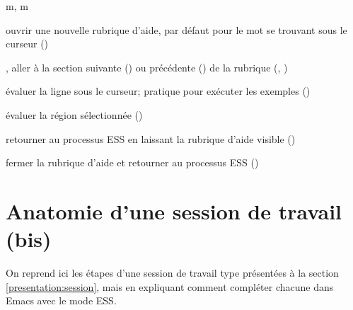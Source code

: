 \begin{ttscript}{m, m}
  \raggedright
\item[\ess{h}] ouvrir une nouvelle rubrique d'aide, par défaut pour le
  mot se trouvant sous le curseur ()
\item[\ess{n}, \ess{p}] aller à la section suivante () ou
  précédente () de la rubrique
  (,
  )
\item[\ess{l}] évaluer la ligne sous le curseur; pratique pour
  exécuter les exemples ()
\item[\ess{r}] évaluer la région sélectionnée ()
\item[\ess{q}] retourner au processus ESS en laissant la rubrique
  d'aide visible ()
\item[\ess{x}] fermer la rubrique d'aide et retourner au processus ESS
  ()
\end{ttscript}



\section{Anatomie d'une session de travail (bis)}
\label{emacs+ess:session}

On reprend ici les étapes d'une session de travail type présentées à
la section \ref{presentation:session}, mais en expliquant comment
compléter chacune dans Emacs avec le mode ESS.

